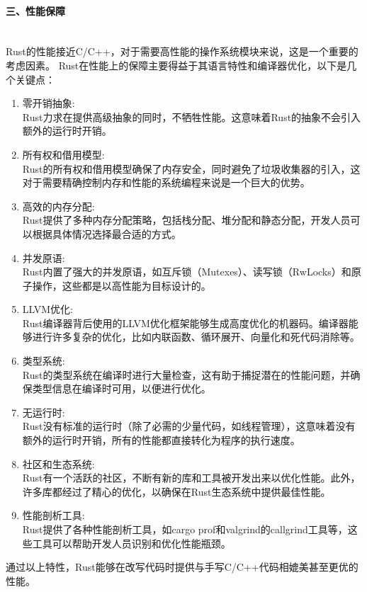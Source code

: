 \documentclass{ctexart}
\begin{document}
\paragraph{三、性能保障}\ \\
\indent Rust的性能接近C/C++，对于需要高性能的操作系统模块来说，这是一个重要的考虑因素。 Rust在性能上的保障主要得益于其语言特性和编译器优化，以下是几个关键点：
\begin{enumerate}
\item 零开销抽象:\\
Rust力求在提供高级抽象的同时，不牺牲性能。这意味着Rust的抽象不会引入额外的运行时开销。
\item 所有权和借用模型:\\
Rust的所有权和借用模型确保了内存安全，同时避免了垃圾收集器的引入，这对于需要精确控制内存和性能的系统编程来说是一个巨大的优势。
\item 高效的内存分配:\\
Rust提供了多种内存分配策略，包括栈分配、堆分配和静态分配，开发人员可以根据具体情况选择最合适的方式。
\item 并发原语:\\
Rust内置了强大的并发原语，如互斥锁（Mutexes）、读写锁（RwLocks）和原子操作，这些都是以高性能为目标设计的。
\item LLVM优化:\\
Rust编译器背后使用的LLVM优化框架能够生成高度优化的机器码。编译器能够进行许多复杂的优化，比如内联函数、循环展开、向量化和死代码消除等。
\item 类型系统:\\
Rust的类型系统在编译时进行大量检查，这有助于捕捉潜在的性能问题，并确保类型信息在编译时可用，以便进行优化。
\item 无运行时:\\
Rust没有标准的运行时（除了必需的少量代码，如线程管理），这意味着没有额外的运行时开销，所有的性能都直接转化为程序的执行速度。
\item 社区和生态系统:\\
Rust有一个活跃的社区，不断有新的库和工具被开发出来以优化性能。此外，许多库都经过了精心的优化，以确保在Rust生态系统中提供最佳性能。
\item 性能剖析工具:\\
Rust提供了各种性能剖析工具，如cargo prof和valgrind的callgrind工具等，这些工具可以帮助开发人员识别和优化性能瓶颈。
\end{enumerate}
通过以上特性，Rust能够在改写代码时提供与手写C/C++代码相媲美甚至更优的性能。
\end{document}
